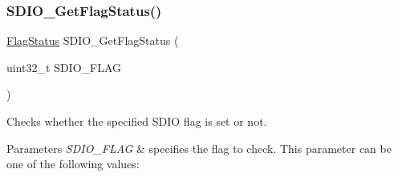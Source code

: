 \subsubsection{\texorpdfstring{SDIO\_GetFlagStatus()}{SDIO\_GetFlagStatus()}}
{\footnotesize\ttfamily \mbox{\hyperlink{group___exported__types_ga89136caac2e14c55151f527ac02daaff}{Flag\+Status}} S\+D\+I\+O\+\_\+\+Get\+Flag\+Status (\begin{DoxyParamCaption}\item[{uint32\+\_\+t}]{S\+D\+I\+O\+\_\+\+F\+L\+AG }\end{DoxyParamCaption})}



Checks whether the specified S\+D\+IO flag is set or not. 


\begin{DoxyParams}{Parameters}
{\em S\+D\+I\+O\+\_\+\+F\+L\+AG} & specifies the flag to check. This parameter can be one of the following values\+: \begin{DoxyItemize}

\end{DoxyItemize}
\end{DoxyParams}
